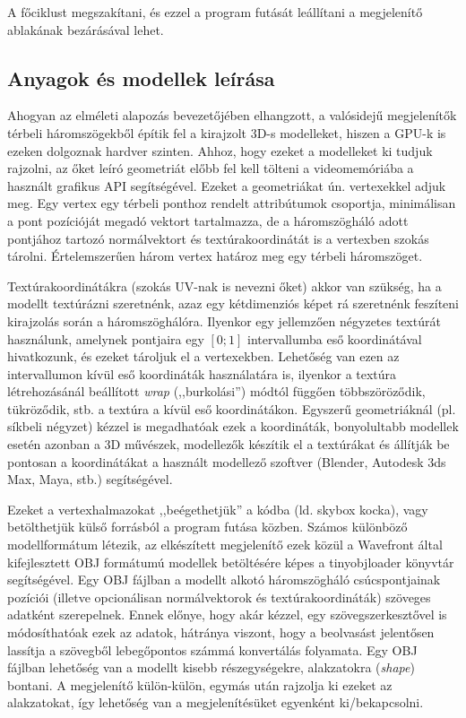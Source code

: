 A főciklust megszakítani, és ezzel a program futását leállítani a megjelenítő ablakának bezárásával lehet.

\subsection{Anyagok és modellek leírása}

Ahogyan az elméleti alapozás bevezetőjében elhangzott, a valósidejű megjelenítők térbeli háromszögekből építik fel a kirajzolt 3D-s modelleket, hiszen a GPU-k is ezeken dolgoznak hardver szinten. Ahhoz, hogy ezeket a modelleket ki tudjuk rajzolni, az őket leíró geometriát előbb fel kell tölteni a videomemóriába a használt grafikus API segítségével. Ezeket a geometriákat ún. vertexekkel adjuk meg. Egy vertex egy térbeli ponthoz rendelt attribútumok csoportja, minimálisan a pont pozícióját megadó vektort tartalmazza, de a háromszögháló adott pontjához tartozó normálvektort és textúrakoordinátát is a vertexben szokás tárolni. Értelemszerűen három vertex határoz meg egy térbeli háromszöget.

Textúrakoordinátákra (szokás UV-nak is nevezni őket) akkor van szükség, ha a modellt textúrázni szeretnénk, azaz egy kétdimenziós képet rá szeretnénk feszíteni kirajzolás során a háromszöghálóra. Ilyenkor egy jellemzően négyzetes textúrát használunk, amelynek pontjaira egy \([0; 1]\) intervallumba eső koordinátával hivatkozunk, és ezeket tároljuk el a vertexekben. Lehetőség van ezen az intervallumon kívül eső koordináták használatára is, ilyenkor a textúra létrehozásánál beállított \textit{wrap} (,,burkolási'') módtól függően többszöröződik, tükröződik, stb. a textúra a kívül eső koordinátákon. Egyszerű geometriáknál (pl. síkbeli négyzet) kézzel is megadhatóak ezek a koordináták, bonyolultabb modellek esetén azonban a 3D művészek, modellezők készítik el a textúrákat és állítják be pontosan a koordinátákat a használt modellező szoftver (Blender, Autodesk 3ds Max, Maya, stb.) segítségével.

Ezeket a vertexhalmazokat ,,beégethetjük'' a kódba (ld. skybox kocka), vagy betölthetjük külső forrásból a program futása közben. Számos különböző modellformátum létezik, az elkészített megjelenítő ezek közül a Wavefront által kifejlesztett OBJ formátumú modellek betöltésére képes a tinyobjloader könyvtár segítségével. Egy OBJ fájlban a modellt alkotó háromszögháló csúcspontjainak pozíciói (illetve opcionálisan normálvektorok és textúrakoordináták) szöveges adatként szerepelnek. Ennek előnye, hogy akár kézzel, egy szövegszerkesztővel is módosíthatóak ezek az adatok, hátránya viszont, hogy a beolvasást jelentősen lassítja a szövegből lebegőpontos számmá konvertálás folyamata. Egy OBJ fájlban lehetőség van a modellt kisebb részegységekre, alakzatokra (\textit{shape}) bontani. A megjelenítő külön-külön, egymás után rajzolja ki ezeket az alakzatokat, így lehetőség van a megjelenítésüket egyenként ki/bekapcsolni.

